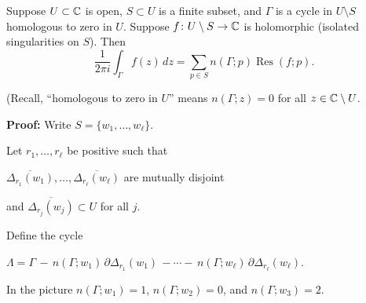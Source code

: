\documentclass[10pt,aspectratio=169]{beamer}
\begin{document}
\begin{frame}

\begin{theorem}
Suppose $U \subset {\mathbb{C}}$ is open, $S \subset U$ is a finite subset,
and $\Gamma$ is
a cycle
in $U \setminus S$
homologous to zero in $U$.
Suppose $f \colon U \setminus S \to {\mathbb{C}}$ is holomorphic (isolated
singularities on $S$).
Then
\begin{equation*}
\frac{1}{2\pi i} \int_{\Gamma} f(z) \, dz = \sum_{p \in S} n(\Gamma;p) \operatorname{Res}(f;p) .
\end{equation*}
\end{theorem}

{\small
(Recall, ``homologous to zero in $U$'' means
$n(\Gamma;z) = 0$ for all $z \in {\mathbb{C}} \setminus U$.}

\medskip
\pause

\textbf{Proof:}
Write $S = \{ w_1,\ldots,w_\ell \}$.

\pause
Let $r_1,\ldots,r_\ell$ be positive
such that

$\overline{\Delta_{r_1}(w_1)},\ldots, \overline{\Delta_{r_\ell}(w_\ell)}$
are mutually disjoint
\pause

and
$\overline{\Delta_{r_j}(w_j)} \subset U$ for all $j$.

\pause
\medskip

\vspace*{-1.0in}
\hspace*{2.6in}

\vspace*{-20pt}

Define the cycle

\medskip

$
\Lambda = \Gamma \,
- \, n(\Gamma;w_1) \, \partial \Delta_{r_1} (w_1)
\, -
\cdots
- \, n(\Gamma;w_\ell) \, \partial \Delta_{r_\ell} (w_\ell)$.

\pause
\medskip

In the picture \quad 
$n(\Gamma;w_1) = 1$, $n(\Gamma;w_2)=0$, and
$n(\Gamma;w_3) = 2$.

\end{frame}
\end{document}
